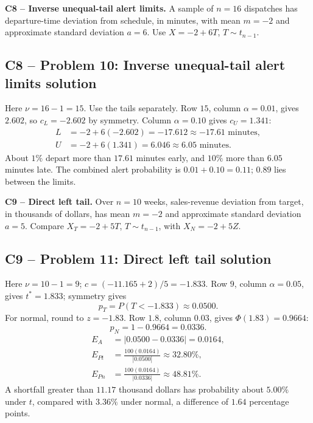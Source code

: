 {
\textbf{C8 -- Inverse unequal-tail alert limits.} A sample of $n=16$ dispatches has departure-time deviation from schedule, in minutes, with mean $m=-2$ and approximate standard deviation $a=6$. Use $X=-2+6T$, $T\sim t_{n-1}$.
\label{sol:q10}
\subsection*{C8 -- Problem 10: Inverse unequal-tail alert limits solution }
Here $\nu=16-1=15$. Use the tails separately.
Row $15$, column $\alpha=0.01$, gives $2.602$, so $c_L=-2.602$ by symmetry.
Column $\alpha=0.10$ gives $c_U=1.341$:
\[
 \begin{aligned}
 L&=-2+6(-2.602)=-17.612\approx\boxed{-17.61\text{ minutes}},\\
 U&=-2+6(1.341)=6.046\approx\boxed{6.05\text{ minutes}}.
 \end{aligned}
\]
About $1\%$ depart more than $17.61$ minutes early, and $10\%$ more than $6.05$ minutes late.
The combined alert probability is $0.01+0.10=0.11$; $0.89$ lies between the limits.
\secInicio[sec:q10]
}

{
\textbf{C9 -- Direct left tail.} Over $n=10$ weeks, sales-revenue deviation from target, in thousands of dollars, has mean $m=-2$ and approximate standard deviation $a=5$. Compare $X_T=-2+5T$, $T\sim t_{n-1}$, with $X_N=-2+5Z$.
\label{sol:q11}
\subsection*{C9 -- Problem 11: Direct left tail solution }
Here $\nu=10-1=9$; $c=(-11.165+2)/5=-1.833$.
Row $9$, column $\alpha=0.05$, gives $t^*=1.833$; symmetry gives
\[
 p_T=P(T<-1.833)\approx\boxed{0.0500}.
\]
For normal, round to $z=-1.83$. Row $1.8$, column $0.03$, gives $\Phi(1.83)=0.9664$:
\[
 p_N=1-0.9664=\boxed{0.0336}.
\]
\[
 \begin{aligned}
 E_A&=|0.0500-0.0336|=\boxed{0.0164},\\
 E_{Pt}&=\frac{100(0.0164)}{|0.0500|}\approx\boxed{32.80\%},\\
 E_{Pn}&=\frac{100(0.0164)}{|0.0336|}\approx\boxed{48.81\%}.
 \end{aligned}
\]
A shortfall greater than $11.17$ thousand dollars has probability about $5.00\%$ under $t$, compared with $3.36\%$ under normal, a difference of $1.64$ percentage points.
\secInicio[sec:q11]
}

